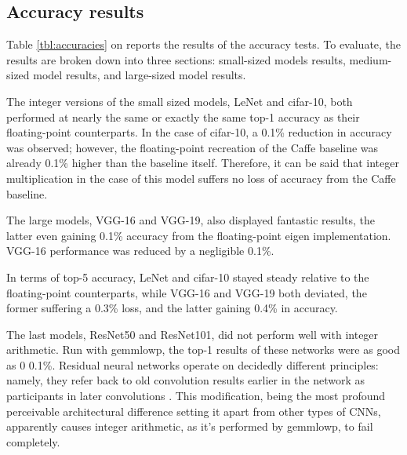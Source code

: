 \subsection{Accuracy results}
Table \ref{tbl:accuracies} on \pageref{tbl:accuracies} reports the results of the accuracy tests. To evaluate, the results are broken down into three sections: small-sized models results, medium-sized model results, and large-sized model results.

The integer versions of the small sized models, LeNet and cifar-10, both performed at nearly the same or exactly the same top-1 accuracy as their floating-point counterparts. In the case of cifar-10, a 0.1\% reduction in accuracy was observed; however, the floating-point recreation of the Caffe baseline was already 0.1\% higher than the baseline itself. Therefore, it can be said that integer multiplication in the case of this model suffers no loss of accuracy from the Caffe baseline.

The large models, VGG-16 and VGG-19, also displayed fantastic results, the latter even gaining 0.1\% accuracy from the floating-point eigen implementation. VGG-16 performance was reduced by a negligible 0.1\%.

In terms of top-5 accuracy, LeNet and cifar-10 stayed steady relative to the floating-point counterparts, while VGG-16 and VGG-19 both deviated, the former suffering a 0.3\% loss, and the latter gaining 0.4\% in accuracy.

The last models, ResNet50 and ResNet101, did not perform well with integer arithmetic. Run with gemmlowp, the top-1 results of these networks were as good as 0\/ 0.1\%. Residual neural networks operate on decidedly different principles: namely, they refer back to old convolution results earlier in the network as participants in later convolutions \cite{resnets2}. This modification, being the most profound perceivable architectural difference setting it apart from other types of CNNs, apparently causes integer arithmetic, as it's performed by gemmlowp, to fail completely.


